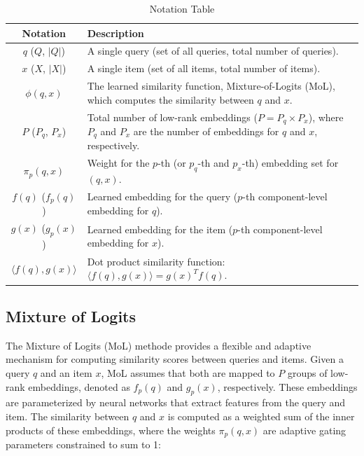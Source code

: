 \documentclass[review]{jair}
\begin{document}
\begin{table}[h]
	\centering
	\large  %
	\begin{tabular}{|c|p{10cm}|}  %
		\hline
		\textbf{Notation} & \textbf{Description} \\ \hline
		\( q \) (\( Q \), \( |Q| \)) & A single query (set of all queries, total number of queries). \\ \hline
		\( x \) (\( X \), \( |X| \)) & A single item (set of all items, total number of items). \\ \hline
		\( \phi(q, x) \) & The learned similarity function, Mixture-of-Logits (MoL), which computes the similarity between \( q \) and \( x \). \\ \hline
		\( P \) (\( P_q \), \( P_x \)) & Total number of low-rank embeddings (\( P = P_q \times P_x \)), where \( P_q \) and \( P_x \) are the number of embeddings for \( q \) and \( x \), respectively. \\ \hline
		\( \pi_p(q, x) \)  & Weight for the \( p \)-th (or \( p_q \)-th and \( p_x \)-th) embedding set for \( (q, x) \). \\ \hline
		\( f(q) \) (\( f_p(q) \)) & Learned embedding for the query (\( p \)-th component-level embedding for \( q \)). \\ \hline
		\( g(x) \) (\( g_p(x) \)) & Learned embedding for the item (\( p \)-th component-level embedding for \( x \)). \\ \hline
		\( \langle f(q), g(x) \rangle \) & Dot product similarity function: \( \langle f(q), g(x) \rangle = g(x)^T f(q) \). \\ \hline
	\end{tabular}
	\caption{Notation Table }
	\label{tab:Notations_table}
\end{table}


\subsection{Mixture of Logits} 

The Mixture of Logits (MoL)\cite{zhai2023revisiting,ding2024efficient} methode provides a flexible and adaptive mechanism for computing similarity scores between queries and items. Given a query \( q \) and an item \( x \), MoL assumes that both are mapped to \( P \) groups of low-rank embeddings, denoted as \( f_p(q) \) and \( g_p(x) \), respectively. These embeddings are parameterized by neural networks that extract features from the query and item. The similarity between \( q \) and \( x \) is computed as a weighted sum of the inner products of these embeddings, where the weights \( \pi_p(q, x) \)\cite{zhai2023revisiting,ding2024efficient} are adaptive gating parameters constrained to sum to 1:
\end{document}
